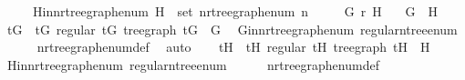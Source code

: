 \begin{isabellebody}
\ \ \ \ \ H{\isacharunderscore}{\kern0pt}in{\isacharunderscore}{\kern0pt}n{\isacharunderscore}{\kern0pt}rtree{\isacharunderscore}{\kern0pt}graph{\isacharunderscore}{\kern0pt}enum{\isacharcolon}{\kern0pt}\ {\isachardoublequoteopen}H\ {\isasymin}\ set\ {\isacharparenleft}{\kern0pt}n{\isacharunderscore}{\kern0pt}rtree{\isacharunderscore}{\kern0pt}graph{\isacharunderscore}{\kern0pt}enum\ n{\isacharparenright}{\kern0pt}{\isachardoublequoteclose}\isanewline
\ \ \ \ \ {\isachardoublequoteopen}G\ {\isasymsimeq}\isactrlsub r\ H{\isachardoublequoteclose}\isanewline
\ \ \ {\isachardoublequoteopen}G\ {\isacharequal}{\kern0pt}\ H{\isachardoublequoteclose}\isanewline
%
\isadelimproof
%
\endisadelimproof
%
\isatagproof
{}\isamarkupfalse%
{\isacharminus}{\kern0pt}\isanewline
\ \ \isamarkupfalse%
\ t\isactrlsub G\ \ t{\isacharunderscore}{\kern0pt}G{\isacharcolon}{\kern0pt}\ {\isachardoublequoteopen}regular\ t\isactrlsub G{\isachardoublequoteclose}\ {\isachardoublequoteopen}tree{\isacharunderscore}{\kern0pt}graph\ t\isactrlsub G\ {\isacharequal}{\kern0pt}\ G{\isachardoublequoteclose}\ \isamarkupfalse%
\ G{\isacharunderscore}{\kern0pt}in{\isacharunderscore}{\kern0pt}n{\isacharunderscore}{\kern0pt}rtree{\isacharunderscore}{\kern0pt}graph{\isacharunderscore}{\kern0pt}enum\ regular{\isacharunderscore}{\kern0pt}n{\isacharunderscore}{\kern0pt}tree{\isacharunderscore}{\kern0pt}enum\isanewline
\ \ \ \ \isamarkupfalse%
\ n{\isacharunderscore}{\kern0pt}rtree{\isacharunderscore}{\kern0pt}graph{\isacharunderscore}{\kern0pt}enum{\isacharunderscore}{\kern0pt}def\ \isamarkupfalse%
\ auto\isanewline
\ \ \isamarkupfalse%
\ t\isactrlsub H\ \ t{\isacharunderscore}{\kern0pt}H{\isacharcolon}{\kern0pt}\ {\isachardoublequoteopen}regular\ t\isactrlsub H{\isachardoublequoteclose}\ {\isachardoublequoteopen}tree{\isacharunderscore}{\kern0pt}graph\ t\isactrlsub H\ {\isacharequal}{\kern0pt}\ H{\isachardoublequoteclose}\ \isamarkupfalse%
\ H{\isacharunderscore}{\kern0pt}in{\isacharunderscore}{\kern0pt}n{\isacharunderscore}{\kern0pt}rtree{\isacharunderscore}{\kern0pt}graph{\isacharunderscore}{\kern0pt}enum\ regular{\isacharunderscore}{\kern0pt}n{\isacharunderscore}{\kern0pt}tree{\isacharunderscore}{\kern0pt}enum\isanewline
\ \ \ \ \isamarkupfalse%
\ n{\isacharunderscore}{\kern0pt}rtree{\isacharunderscore}{\kern0pt}graph{\isacharunderscore}{\kern0pt}enum{\isacharunderscore}{\kern0pt}def\ \isamarkupfalse%

\end{isabellebody}
